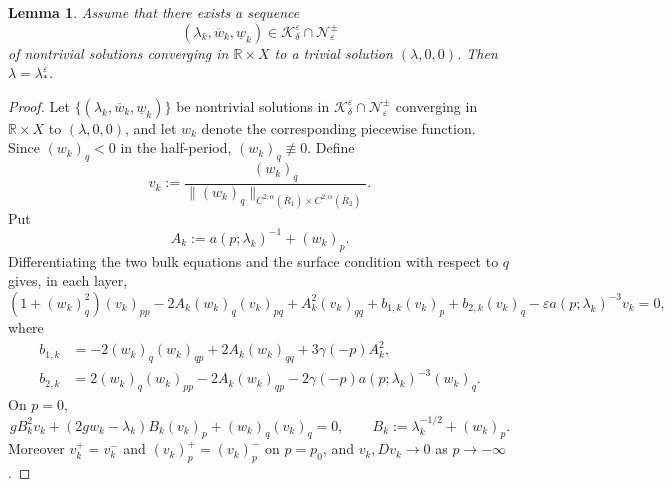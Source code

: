\documentclass[11pt,reqno]{amsart}
\numberwithin{equation}{section}
\newtheorem{lemma}[theorem]{Lemma}
\theoremstyle{definition}
\theoremstyle{remark}
\begin{document}
\begin{lemma}\label{lem4.9}
Assume that there exists a sequence
\[
 (\lambda_k,\overline w_k,\underline w_k)
 \in\mathcal K_\delta^\varepsilon
 \cap\mathcal N_\varepsilon^{\pm}
\]
of nontrivial solutions converging in $\mathbb R\times X$ to a
trivial solution $(\lambda,0,0)$.  Then
$\lambda=\lambda_*^\varepsilon$.
\end{lemma}
\begin{proof}
Let
$\{(\lambda_k,\overline w_k,\underline w_k)\}$ be nontrivial
solutions in $\mathcal K_\delta^\varepsilon\cap\mathcal N_\varepsilon^{\pm}$
converging in $\mathbb R\times X$ to $(\lambda,0,0)$, and let $w_k$
denote the corresponding piecewise function.  Since
$(w_k)_q<0$ in the half-period, $(w_k)_q\not\equiv0$.  Define
\[
 v_k:=\frac{(w_k)_q}
 {\|(w_k)_q\|_{C^{2,\alpha}(\overline R_1)
 \times C^{2,\alpha}(\overline R_2)}}.
\]
Put
\[
 A_k:=a(p;\lambda_k)^{-1}+(w_k)_p.
\]
Differentiating the two bulk equations and the surface condition
with respect to $q$ gives, in each layer,
\begin{equation}\label{eq:vk-nonlinear}
 (1+(w_k)_q^2)(v_k)_{pp}
 -2A_k(w_k)_q(v_k)_{pq}
 +A_k^2(v_k)_{qq}
 +b_{1,k}(v_k)_p+b_{2,k}(v_k)_q
 -\varepsilon a(p;\lambda_k)^{-3}v_k=0,
\end{equation}
where
\begin{align*}
 b_{1,k}&=-2(w_k)_q(w_k)_{qp}
 +2A_k(w_k)_{qq}
 +3\gamma(-p)A_k^2,\\
 b_{2,k}&=2(w_k)_q(w_k)_{pp}
 -2A_k(w_k)_{qp}
 -2\gamma(-p)a(p;\lambda_k)^{-3}(w_k)_q.
\end{align*}
On $p=0$,
\begin{equation}\label{eq:vk-boundary}
 gB_k^2v_k+(2gw_k-\lambda_k)B_k(v_k)_p
 +(w_k)_q(v_k)_q=0,
 \qquad
 B_k:=\lambda_k^{-1/2}+(w_k)_p.
\end{equation}
Moreover $v_k^+=v_k^-$ and $(v_k)_p^+=(v_k)_p^-$ on $p=p_0$,
and $v_k,Dv_k\to0$ as $p\to-\infty$.


\end{proof}
\end{document}
